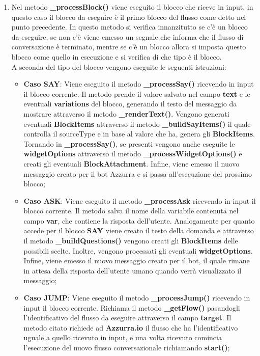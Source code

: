 \begin{enumerate}
	\item Nel metodo \textbf{\_processBlock()} viene eseguito il blocco che riceve in input, in questo caso il blocco da eseguire è il primo blocco del flusso come detto nel punto precedente. In questo metodo si verifica innanzitutto se c'è un blocco da eseguire, se non c'è viene emesso un segnale che informa che il flusso di conversazione è terminato, mentre se c'è un blocco allora si imposta questo blocco come quello in esecuzione e si verifica di che tipo è il blocco.\\
	A seconda del tipo del blocco vengono eseguite le seguenti istruzioni:
	\begin{itemize}
		\item \textbf{Caso SAY}: Viene eseguito il metodo \textbf{\_processSay()} ricevendo in input il blocco corrente. Il metodo prende il valore salvato nel campo \textbf{text} e le eventuali \textbf{variations} del blocco, generando il testo del messaggio da mostrare attraverso il metodo \textbf{\_renderText()}. Vengono generati eventuali \textbf{BlockItems} attraverso il metodo \textbf{\_buildSayItems()} il quale controlla il sourceType e in base al valore che ha, genera gli \textbf{BlockItems}. Tornando in \textbf{\_processSay()}, se presenti vengono anche eseguite le \textbf{widgetOptions} attraverso il metodo \textbf{\_processWidgetOptions()} e creati gli eventuali \textbf{BlockAttachment}. Infine, viene emesso il nuovo messaggio creato per il bot Azzurra e si passa all'esecuzione del prossimo blocco;
		\item \textbf{Caso ASK}: Viene eseguito il metodo \textbf{\_processAsk} ricevendo in input il blocco corrente. Il metodo salva il nome della variabile contenuta nel campo \textbf{var}, che contiene la risposta dell'utente. Analogamente per quanto accede per il blocco \textbf{SAY} viene creato il testo della domanda e attraverso il metodo \textbf{\_buildQuestions()} vengono creati gli \textbf{BlockItems} delle possibili scelte. Inoltre, vengono processati gli eventuali \textbf{widgetOptions}. Infine, viene emesso il nuovo messaggio creato per il bot, il quale rimane in attesa della risposta dell'utente umano quando verrà visualizzato il messaggio;
		\item \textbf{Caso JUMP}: Viene eseguito il metodo \textbf{\_processJump()} ricevendo in input il blocco corrente. Richiama il metodo \textbf{\_getFlow()} pasandogli l'identificativo del flusso da eseguire attraverso il campo \textbf{target}. Il metodo citato richiede ad \textbf{Azzurra.io} il flusso che ha l'identificativo uguale a quello ricevuto in input, e una volta ricevuto comincia l'esecuzione del nuovo flusso conversazionale richiamando \textbf{start()};

\end{itemize}
\end{enumerate}
